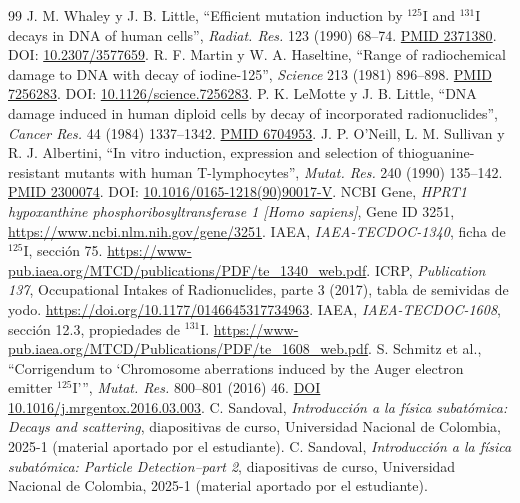 \documentclass[11pt,a4paper]{article}
\begin{document}
\begin{thebibliography}{99}
 J. M. Whaley y J. B. Little, ``Efficient mutation induction by $^{125}$I and $^{131}$I decays in DNA of human cells'', \emph{Radiat. Res.} 123 (1990) 68--74. \href{https://pubmed.ncbi.nlm.nih.gov/2371380/}{PMID 2371380}. DOI: \href{https://doi.org/10.2307/3577659}{10.2307/3577659}.
 R. F. Martin y W. A. Haseltine, ``Range of radiochemical damage to DNA with decay of iodine-125'', \emph{Science} 213 (1981) 896--898. \href{https://pubmed.ncbi.nlm.nih.gov/7256283/}{PMID 7256283}. DOI: \href{https://doi.org/10.1126/science.7256283}{10.1126/science.7256283}.
 P. K. LeMotte y J. B. Little, ``DNA damage induced in human diploid cells by decay of incorporated radionuclides'', \emph{Cancer Res.} 44 (1984) 1337--1342. \href{https://pubmed.ncbi.nlm.nih.gov/6704953/}{PMID 6704953}.
 J. P. O'Neill, L. M. Sullivan y R. J. Albertini, ``In vitro induction, expression and selection of thioguanine-resistant mutants with human T-lymphocytes'', \emph{Mutat. Res.} 240 (1990) 135--142. \href{https://pubmed.ncbi.nlm.nih.gov/2300074/}{PMID 2300074}. DOI: \href{https://doi.org/10.1016/0165-1218(90)90017-V}{10.1016/0165-1218(90)90017-V}.
 NCBI Gene, \emph{HPRT1 hypoxanthine phosphoribosyltransferase 1 [Homo sapiens]}, Gene ID 3251, \url{https://www.ncbi.nlm.nih.gov/gene/3251}.
 IAEA, \emph{IAEA-TECDOC-1340}, ficha de $^{125}$I, sección 75. \url{https://www-pub.iaea.org/MTCD/publications/PDF/te_1340_web.pdf}.
 ICRP, \emph{Publication 137}, Occupational Intakes of Radionuclides, parte 3 (2017), tabla de semividas de yodo. \url{https://doi.org/10.1177/0146645317734963}.
 IAEA, \emph{IAEA-TECDOC-1608}, sección 12.3, propiedades de $^{131}$I. \url{https://www-pub.iaea.org/MTCD/Publications/PDF/te_1608_web.pdf}.
 S. Schmitz et al., ``Corrigendum to `Chromosome aberrations induced by the Auger electron emitter $^{125}$I''', \emph{Mutat. Res.} 800--801 (2016) 46. \href{https://doi.org/10.1016/j.mrgentox.2016.03.003}{DOI 10.1016/j.mrgentox.2016.03.003}.
 C. Sandoval, \emph{Introducción a la física subatómica: Decays and scattering}, diapositivas de curso, Universidad Nacional de Colombia, 2025-1 (material aportado por el estudiante).
 C. Sandoval, \emph{Introducción a la física subatómica: Particle Detection--part 2}, diapositivas de curso, Universidad Nacional de Colombia, 2025-1 (material aportado por el estudiante).
\end{thebibliography}
\end{document}
